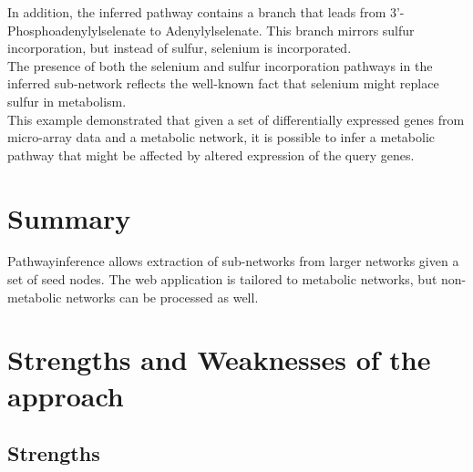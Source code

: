 In addition, the inferred pathway contains a branch that leads
from 3'-Phosphoadenylylselenate to Adenylylselenate.
This branch mirrors sulfur incorporation, but instead of sulfur, selenium is incorporated.\\

The presence of both the selenium and sulfur incorporation pathways in the inferred sub-network
reflects the well-known fact that selenium might replace sulfur in metabolism.\\

This example demonstrated that given a set of differentially expressed genes from
micro-array data and a metabolic network, it is possible to infer a metabolic pathway
that might be affected by altered expression of the query genes.

\section{Summary}

Pathwayinference allows extraction of sub-networks from larger networks given a set of seed nodes. The web application
is tailored to metabolic networks, but non-metabolic networks can be processed as well.

\section{Strengths and Weaknesses of the approach}

\subsection{Strengths}

